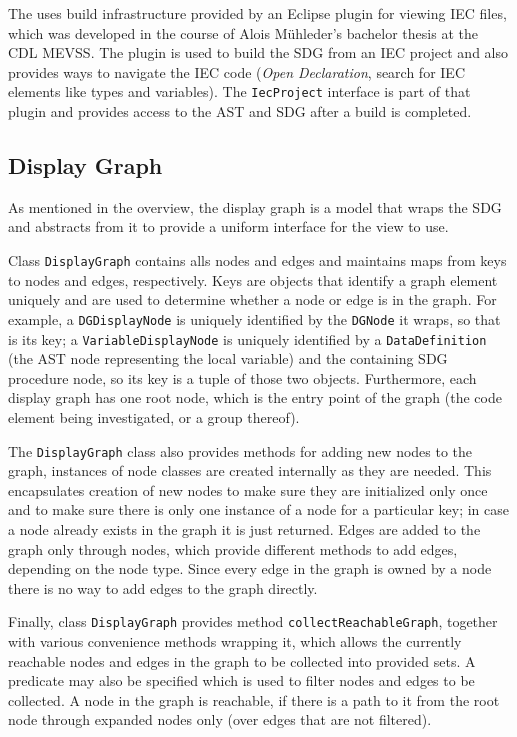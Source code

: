 The \SB uses build infrastructure provided by an Eclipse plugin for viewing IEC files, which was developed in the 
course of Alois Mühleder's bachelor thesis \cite{MuehlederBA} at the CDL MEVSS. The plugin is used to build the SDG 
from an IEC project and also provides ways to navigate the IEC code (\emph{Open Declaration}, search for IEC 
elements like types and variables). The \lstinline|IecProject| interface is part of that plugin and provides access to 
the AST and SDG after a build is completed.

\subsection{Display Graph}

As mentioned in the overview, the display graph is a model that wraps the SDG and abstracts from it to provide a 
uniform interface for the view to use.

Class \lstinline|DisplayGraph| contains alls nodes and edges and maintains maps from keys to nodes and edges, 
respectively. Keys are objects that identify a graph element uniquely and are used to determine whether a node or edge 
is in the graph. For example, a \lstinline|DGDisplayNode| is uniquely identified by the \lstinline|DGNode| it wraps, so 
that is its key; a \lstinline|VariableDisplayNode| is uniquely identified by a \lstinline|DataDefinition| (the AST node 
representing the local variable) and the containing SDG procedure node, so its key is a tuple of those two objects. 
Furthermore, each display graph has one root node, which is the entry point of the graph (the code element being 
investigated, or a group thereof).

The \lstinline|DisplayGraph| class also provides methods for adding new nodes to the graph, instances of node classes 
are created internally as they are needed. This encapsulates creation of new nodes to make sure they are initialized 
only once and to make sure there is only one instance of a node for a particular key; in case a node already exists in 
the graph it is just returned. Edges are added to the graph only through nodes, which provide different methods to add 
edges, depending on the node type. Since every edge in the graph is owned by a node there is no way to add edges to the 
graph directly.

Finally, class \lstinline|DisplayGraph| provides method \lstinline|collectReachableGraph|, together with various 
convenience methods wrapping it, which allows the currently reachable nodes and edges in the graph to be collected into 
provided sets. A predicate may also be specified which is used to filter nodes and edges to be collected. A node in the 
graph is reachable, if there is a path to it from the root node through expanded nodes only (over edges that are not 
filtered).

